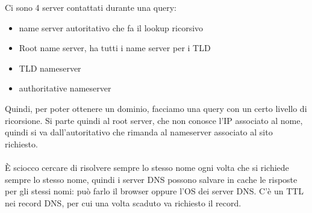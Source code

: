 \documentclass[12pt, oneside]{extbook} %
\begin{document}
Ci sono 4 server contattati durante una query:
\begin{itemize}
	\item name server autoritativo che fa il lookup ricorsivo
	\item Root name server, ha tutti i name server per i TLD
	\item TLD nameserver 
	\item authoritative nameserver
\end{itemize}
Quindi, per poter ottenere un dominio, facciamo una query con un certo livello di ricorsione. Si parte quindi al root server, che non conosce l'IP associato al nome, quindi si va dall'autoritativo che rimanda al nameserver associato al sito richiesto.\\\\È sciocco cercare di risolvere sempre lo stesso nome ogni volta che si richiede sempre lo stesso nome, quindi i server DNS possono salvare in cache le risposte per gli stessi nomi: può farlo il browser oppure l'OS dei server DNS. C'è un TTL nei record DNS, per cui una volta scaduto va richiesto il record.
\end{document}
